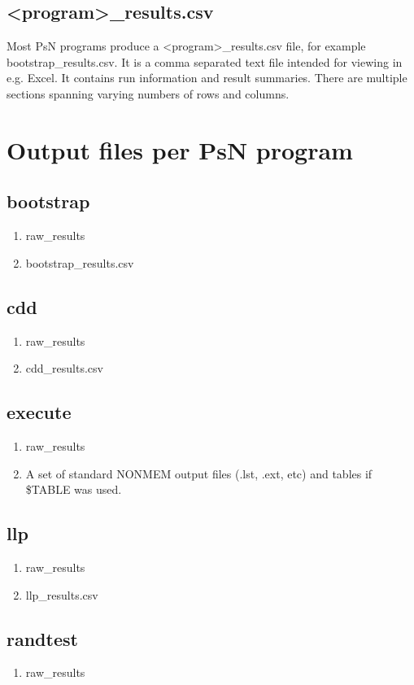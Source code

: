 \subsection{<program>\_results.csv}
Most PsN programs produce a <program>\_results.csv file, for example bootstrap\_results.csv. 
It is a comma separated text file intended for viewing in e.g. Excel. 
It contains run information and 
result summaries. There are multiple sections spanning varying numbers of rows and columns.


\section{Output files per PsN program}
\subsection{bootstrap}
\begin{enumerate}
\item raw\_results 
\item bootstrap\_results.csv 
\end{enumerate}
\subsection{cdd}
\begin{enumerate}
\item raw\_results 
\item cdd\_results.csv 
\end{enumerate}
\subsection{execute}
\begin{enumerate}
\item raw\_results
\item A set of standard NONMEM output files (.lst, .ext, etc) and tables if \$TABLE was used.
\end{enumerate}
\subsection{llp}
\begin{enumerate}
\item raw\_results 
\item llp\_results.csv 
\end{enumerate}
\subsection{randtest}
\begin{enumerate}
\item raw\_results 
\end{enumerate}
